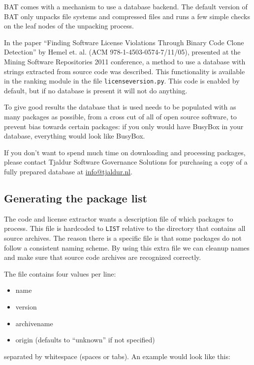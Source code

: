\documentclass[10pt]{article}
\begin{document}
BAT comes with a mechanism to use a database backend. The default version of
BAT only unpacks file systems and compressed files and runs a few simple checks
on the leaf nodes of the unpacking process.

In the paper ``Finding Software License Violations Through Binary Code Clone
Detection'' by Hemel et. al. (ACM 978-1-4503-0574-7/11/05), presented at
the Mining Software Repositories 2011 conference, a method to use a database
with strings extracted from source code was described. This functionality is
available in the ranking module in the file \texttt{licenseversion.py}. This
code is enabled by default, but if no database is present it will not do
anything.

To give good results the database that is used needs to be populated with as
many packages as possible, from a cross cut of all of open source software, to
prevent bias towards certain packages: if you only would have BusyBox in your
database, everything would look like BusyBox.

If you don't want to spend much time on downloading and processing
packages, please contact Tjaldur Software Governance Solutions for
purchasing a copy of a fully prepared database at \url{info@tjaldur.nl}.

\subsection{Generating the package list}

The code and license extractor wants a description file of which packages to
process. This file is hardcoded to \texttt{LIST} relative to the directory that
contains all source archives. The reason there is a specific file is that some
packages do not follow a consistent naming scheme. By using this extra file we
can cleanup names and make sure that source code archives are recognized
correctly.

The file contains four values per line:

\begin{itemize}
\item name
\item version
\item archivename
\item origin (defaults to ``unknown'' if not specified)
\end{itemize}

separated by whitespace (spaces or tabs). An example would look like this:
\end{document}
